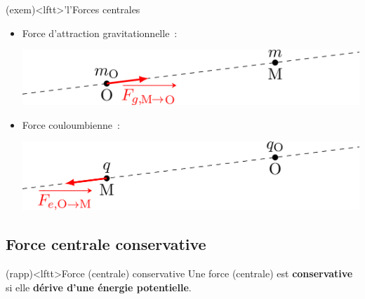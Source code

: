 \documentclass[../../main/main.tex]{subfiles}
\begin{document}
\begin{tcb*}(exem)<lftt>'l'{Forces centrales}
	\begin{itemize}
		\item Force d'attraction gravitationnelle~:
		      \smallbreak
		      \begin{minipage}{0.45\linewidth}
			      \psw{
				      \[\Ff_g = -\Gc \frac{m_\Or m}{r^2}\ur\]
			      }
		      \end{minipage}
		      \hfill
		      \begin{minipage}{0.45\linewidth}
			      \begin{center}
				      \includegraphics[scale=1]{intro_ex-grav}
			      \end{center}
		      \end{minipage}
		\item Force couloumbienne~: \smallbreak
		      \begin{minipage}{0.45\linewidth}
			      \psw{
				      \[\Ff_e = \frac{1}{4\pi\ep_0} \frac{qq_\Or}{r^2}\ur\]
			      }
		      \end{minipage}
		      \hfill
		      \begin{minipage}{0.45\linewidth}
			      \includegraphics[scale=1]{intro_ex-elec}
		      \end{minipage}
	\end{itemize}
	\vspace{-15pt}
\end{tcb*}

\subsection{Force centrale conservative}
\begin{tcb*}(rapp)<lftt>{Force (centrale) conservative}
	Une force (centrale) est \textbf{conservative} si elle \textbf{dérive d'une
		énergie potentielle}.
\end{tcb*}
\end{document}
